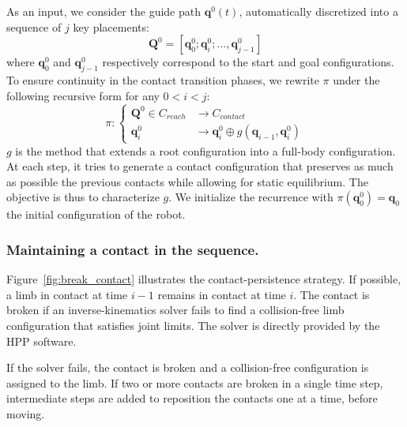 As an input, we consider the guide path $\mathbf{q}^0(t)$, automatically discretized into a sequence of $j$ key placements:  
\begin{equation*}
	\mathbf{Q}^0 = [\mathbf{q}^0_{0}; \mathbf{q}^0_{i}; ..., \mathbf{q}^0_{j-1}]
\end{equation*} 
where $\mathbf{q}^0_{0}$ and $\mathbf{q}^0_{j-1}$ respectively correspond to the start and goal configurations. To ensure continuity in the contact transition phases, we rewrite $\pi$ under the following recursive form for any $0<i<j$:
\begin{equation*}
    \pi\colon\left\{
    \begin{aligned}		
        \mathbf{Q}^0 \in C_{reach} & \longrightarrow C_{contact} \\
        \mathbf{q}^{0}_i &  \longrightarrow  \mathbf{q}^{0}_i \oplus g(\mathbf{q}_{i - 1},\mathbf{q}^{0}_i) 
    \end{aligned}
    \right.
\end{equation*} 
$g$ is the method that extends a root configuration into a full-body configuration. At each step, it tries to generate a contact configuration that preserves as much as possible
the previous contacts while allowing for static equilibrium. The objective is thus to characterize $g$.
We initialize the recurrence with $\pi(\mathbf{q}^0_{0}) = \mathbf{q}_0$ the initial configuration of the robot.


\subsubsection{Maintaining a contact in the sequence.}

Figure~\ref{fig:break_contact} illustrates the contact-persistence strategy.
If possible, a limb in contact at time $i-1$ remains in contact at time $i$. The contact is broken if an inverse-kinematics solver fails to find a collision-free limb configuration that satisfies joint limits. The solver is directly provided by the HPP software.

If the solver fails, the contact is broken and a collision-free configuration is assigned to the limb.
If two or more contacts are broken in a single time step, intermediate steps are added to reposition the contacts one at a time, before moving.

